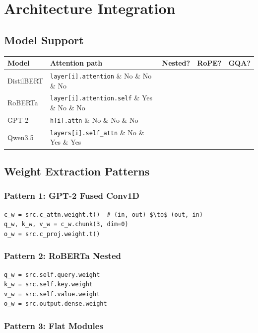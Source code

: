 \section{Architecture Integration}

\subsection{Model Support}

\begin{table}[H]
\centering
\small
\begin{tabular}{lllll}
\toprule
\textbf{Model} & \textbf{Attention path} & \textbf{Nested?} & \textbf{RoPE?} & \textbf{GQA?} \\
\midrule
DistilBERT & \texttt{layer[i].attention} \& No \& No \& No \\
RoBERTa & \texttt{layer[i].attention.self} \& Yes \& No \& No \\
GPT-2 & \texttt{h[i].attn} \& No \& No \& No \\
Qwen3.5 & \texttt{layers[i].self\_attn} \& No \& Yes \& Yes \\
\bottomrule
\end{tabular}
\end{table}

\subsection{Weight Extraction Patterns}

\subsubsection{Pattern 1: GPT-2 Fused Conv1D}

\begin{lstlisting}
c_w = src.c_attn.weight.t()  # (in, out) $\to$ (out, in)
q_w, k_w, v_w = c_w.chunk(3, dim=0)
o_w = src.c_proj.weight.t()
\end{lstlisting}

\subsubsection{Pattern 2: RoBERTa Nested}

\begin{lstlisting}
q_w = src.self.query.weight
k_w = src.self.key.weight
v_w = src.self.value.weight
o_w = src.output.dense.weight
\end{lstlisting}

\subsubsection{Pattern 3: Flat Modules}

